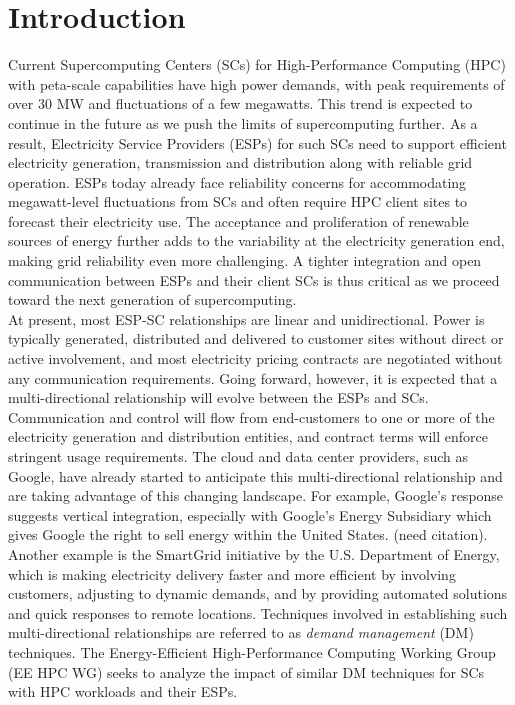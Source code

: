 \section{Introduction}

Current Supercomputing Centers (SCs) for High-Performance Computing (HPC) with peta-scale capabilities have high power demands, with peak requirements of over 30 MW and fluctuations of a few megawatts. This trend is expected to continue in the future as we push the limits of supercomputing further. As a result, Electricity Service Providers (ESPs) for such SCs need to support efficient electricity generation, transmission and distribution along with reliable grid operation. ESPs today already face reliability concerns for accommodating megawatt-level fluctuations from SCs and often require HPC client sites to forecast their electricity use. The acceptance and proliferation of renewable sources of energy further adds to the variability at the electricity generation end, making grid reliability even more challenging. A tighter integration and open communication between ESPs and their client SCs is thus critical as we proceed toward the next generation of supercomputing. \\

At present, most ESP-SC relationships are linear and unidirectional. Power is typically generated, distributed and delivered to customer sites without direct or active involvement, and most electricity pricing contracts are negotiated without any communication requirements. Going forward, however, it is expected that a multi-directional relationship will evolve between the ESPs and SCs.  Communication and control will flow from end-customers to one or more of the electricity generation and distribution entities, and contract terms will enforce stringent usage requirements. The cloud and data center providers, such as Google, have already started to anticipate this multi-directional relationship and are taking advantage of this changing landscape.  For example, Google's response suggests vertical integration, especially with Google's Energy Subsidiary which gives Google the right to sell energy within the United States. (need citation). Another example is the SmartGrid initiative \cite{SmartGrid} by the U.S. Department of Energy, which is making electricity delivery faster and more efficient by involving customers, adjusting to dynamic demands, and by providing automated solutions and quick responses to remote locations. Techniques involved in establishing such multi-directional relationships are referred to as \emph{demand management} (DM) techniques. The Energy-Efficient High-Performance Computing Working Group (EE HPC WG) seeks to analyze the impact of similar DM techniques for SCs with HPC workloads and their ESPs. \\

